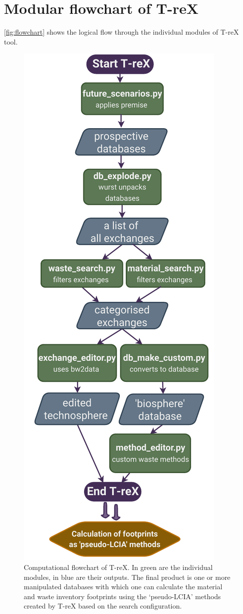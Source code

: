 \documentclass{article}
\begin{document}
\section{Modular flowchart of T-reX}

\autoref{fig:flowchart} shows the logical flow through the individual modules of T-reX tool.

\begin{figure}[H]
    \centering
    \includegraphics[height=0.8\textheight]{figures/T-reX_flowchart.pdf}
    \caption{Computational flowchart of T-reX. In green are the individual modules, in blue are their outputs. The final product is one or more manipulated databases with which one can calculate the material and waste inventory footprints using the `pseudo-LCIA' methods created by T-reX based on the search configuration.}\label{fig:flowchart}
\end{figure}
\end{document}
